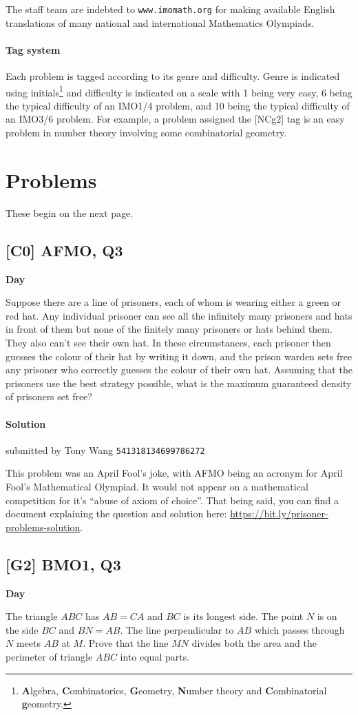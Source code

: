 \documentclass[10pt]{article}
\newcommand{\themonth}{April}
\newcommand{\theyear}{2019}
\newcounter{day}
\newcounter{solution}
\newcommand{\problem}[4][0]{
\newpage
\subsection{[#3] \space #2} \hfill 
{\large\textbf{Day \arabic{day}}} %
\begin{flushleft} #4 \end{flushleft}
\vspace{1em}
\addtocounter{day}{1}
\setcounter{solution}{1}
}
\newcommand{\solution}[4][0]{
\paragraph{Solution \arabic{solution}} \hfill submitted by #2 \hfill \texttt{#3}
\begin{flushleft} #4 \end{flushleft}
\addtocounter{solution}{1}
\vspace{1em}
}
\begin{document}
	The staff team are indebted to \texttt{www.imomath.org} for making available English translations of many national and international Mathematics Olympiads.
	
	 \paragraph{Tag system} Each problem is tagged according to its genre and difficulty. Genre is indicated using initials\footnote{\textbf{A}lgebra, \textbf{C}ombinatorics, \textbf{G}eometry, \textbf{N}umber theory and \textbf{C}ombinatorial \textbf{g}eometry.} and difficulty is indicated on a scale with 1 being very easy, 6 being the typical difficulty of an IMO1/4 problem, and 10 being the typical difficulty of an IMO3/6 problem. For example, a problem assigned the [NCg2] tag is an easy problem in number theory involving some combinatorial geometry.

	\section{Problems}
	
	These begin on the next page.
	
	\problem[7]{2019 AFMO, Q3}{C0}{Suppose there are a line of prisoners, each of whom is wearing either a green or red hat. Any individual prisoner can see all the infinitely many prisoners and hats in front of them but none of the finitely many prisoners or hats behind them. They also can't see their own hat. In these circumstances, each prisoner then guesses the colour of their hat by writing it down, and the prison warden sets free any prisoner who correctly guesses the colour of their own hat. Assuming that the prisoners use the best strategy possible, what is the maximum guaranteed density of prisoners set free?}

	\solution[7]{Tony Wang}{541318134699786272}{This problem was an April Fool's joke, with AFMO being an acronym for April Fool's Mathematical Olympiad. It would not appear on a mathematical competition for it's ``abuse of axiom of choice''. That being said, you can find a document explaining the question and solution here: \url{https://bit.ly/prisoner-problems-solution}.}

	\problem[8]{2017 BMO1, Q3}{G2}{The triangle $ABC$ has $AB = CA$ and $BC$ is its longest side. The point $N$ is on the side $BC$ and $BN = AB$. The line perpendicular to $AB$ which passes through $N$ meets $AB$ at $M$. Prove that the line $MN$ divides both the area and the perimeter of triangle $ABC$ into equal parts.}
\end{document}
